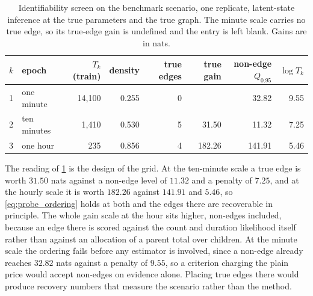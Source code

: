 \begin{table}[t]
\centering
\caption{Identifiability screen on the benchmark scenario, one replicate,
latent-state inference at the true parameters and the true graph. The minute
scale carries no true edge, so its true-edge gain is undefined and the entry is
left blank. Gains are in nats.}
\label{tab:probe}
\begin{tabular}{llrrrrrr}
\toprule
\(k\) & epoch & \(T_k\) (train) & density & true edges & true gain & non-edge \(Q_{0.95}\) & \(\log T_k\) \\
\midrule
1 & one minute  & 14{,}100 & 0.255 & 0 &        &  32.82 & 9.55 \\
2 & ten minutes &  1{,}410 & 0.530 & 5 &  31.50 &  11.32 & 7.25 \\
3 & one hour    &      235 & 0.856 & 4 & 182.26 & 141.91 & 5.46 \\
\bottomrule
\end{tabular}
\end{table}

The reading of \cref{tab:probe} is the design of the grid. At the ten-minute
scale a true edge is worth \(31.50\) nats against a non-edge level of \(11.32\)
and a penalty of \(7.25\), and at the hourly scale it is worth \(182.26\)
against \(141.91\) and \(5.46\), so \eqref{eq:probe_ordering} holds at both and
the edges there are recoverable in principle. The whole gain scale at the hour
sits higher, non-edges included, because an edge there is scored against the
count and duration likelihood itself rather than against an allocation of a
parent total over children. At the minute scale the ordering fails before any
estimator is involved, since a non-edge already reaches \(32.82\) nats against a
penalty of \(9.55\), so a criterion charging the plain price would accept
non-edges on evidence alone. Placing true edges there would produce recovery
numbers that measure the scenario rather than the method.

